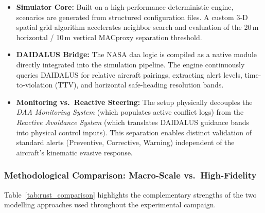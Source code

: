 \begin{itemize}
    \item \textbf{Simulator Core:} Built on a high-performance deterministic engine, scenarios
    are generated from structured configuration files. A custom 3-D spatial grid algorithm
    accelerates neighbor search and evaluation of the 20\,m horizontal / 10\,m vertical
    MACproxy separation threshold.

    \item \textbf{DAIDALUS Bridge:} The NASA \gls{daa} logic is compiled as a native module
    directly integrated into the simulation pipeline. The engine continuously queries DAIDALUS
    for relative aircraft pairings, extracting alert levels, time-to-violation (TTV), and
    horizontal safe-heading resolution bands.

    \item \textbf{Monitoring vs.\ Reactive Steering:} The setup physically decouples the
    \emph{DAA Monitoring System} (which populates active conflict logs) from the
    \emph{Reactive Avoidance System} (which translates DAIDALUS guidance bands into physical
    control inputs). This separation enables distinct validation of standard alerts
    (Preventive, Corrective, Warning) independent of the aircraft's kinematic evasive
    response.
\end{itemize}

\subsubsection{Methodological Comparison: Macro-Scale vs.\ High-Fidelity}
\label{subsec:rust_vs_python}

Table~\ref{tab:rust_comparison} highlights the complementary strengths of the two modelling
approaches used throughout the experimental campaign.

